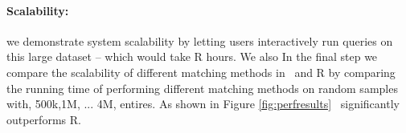 \paragraph{\bf Scalability:}
we demonstrate system
  scalability by letting users interactively run queries on this large
  dataset -- which would take R hours. We also
In the final step we compare the scalability of different matching 
methods in \GSQL \ and R by comparing the running
time of performing different matching methods on random samples with, 500k,1M, ... 4M, entires. As shown
 in Figure \ref{fig:perfresults} \GSQL \ significantly outperforms R.









